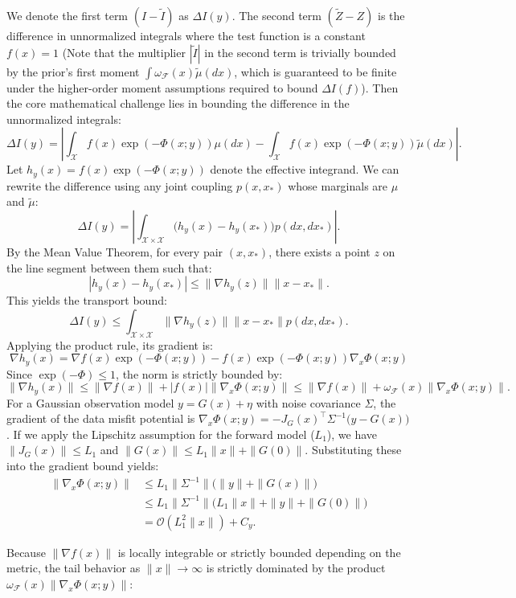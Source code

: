 \documentclass[twoside,11pt]{article}
\begin{document}
We denote the first term $(I - \tilde{I})$ as $\Delta I(y)$. The second term $(\tilde{Z} - Z)$ is the difference in unnormalized integrals where the test function is a constant $f(x) = 1$ (Note that the multiplier $|\tilde{I}|$ in the second term is trivially bounded by the prior's first moment $\int \omega_{\mathcal{F}}(x) \tilde{\mu}(dx)$, which is guaranteed to be finite under the higher-order moment assumptions required to bound $\Delta I(f)$). Then the core mathematical challenge lies in bounding the difference in the unnormalized integrals:$$\Delta I(y) = \left| \int_{\mathcal{X}} f(x) \exp(-\Phi(x;y)) \mu(dx) - \int_{\mathcal{X}} f(x) \exp(-\Phi(x;y)) \tilde{\mu}(dx) \right|.$$Let $h_y(x) = f(x) \exp(-\Phi(x;y))$ denote the effective integrand. We can rewrite the difference using any joint coupling $p(x, x_*)$ whose marginals are $\mu$ and $\tilde{\mu}$:
$$\Delta I(y) = \left| \int_{\mathcal{X} \times \mathcal{X}} \big( h_y(x) - h_y(x_*) \big) p(dx, dx_*) \right|.$$
By the Mean Value Theorem, for every pair $(x, x_*)$, there exists a point $z$ on the line segment between them such that:$$|h_y(x) - h_y(x_*)| \le \|\nabla h_y(z)\| \|x - x_*\|.$$
This yields the transport bound:$$\Delta I(y) \le \int_{\mathcal{X} \times \mathcal{X}} \|\nabla h_y(z)\| \|x - x_*\| p(dx, dx_*).$$
Applying the product rule, its gradient is:
$$\nabla h_y(x) = \nabla f(x) \exp(-\Phi(x;y)) - f(x) \exp(-\Phi(x;y)) \nabla_x \Phi(x;y)$$
Since $\exp(-\Phi) \le 1$, the norm is strictly bounded by:
$$\|\nabla h_y(x)\| \le \|\nabla f(x)\| + |f(x)| \|\nabla_x \Phi(x;y)\| \le \|\nabla f(x)\| + \omega_{\mathcal{F}}(x) \|\nabla_x \Phi(x;y)\|.$$
For a Gaussian observation model $y = G(x) + \eta$ with noise covariance $\Sigma$, the gradient of the data misfit potential is $\nabla_x \Phi(x;y) = -J_G(x)^\top \Sigma^{-1} \big(y - G(x)\big)$. If we apply the Lipschitz assumption for the forward model ($L_1$), we have $\|J_G(x)\| \le L_1$ and $\|G(x)\| \le L_1\|x\| + \|G(0)\|$. Substituting these into the gradient bound yields:
$$
\begin{aligned}
    \|\nabla_x \Phi(x;y)\| &\le L_1 \|\Sigma^{-1}\| \big( \|y\| + \|G(x)\| \big) \\
    &\le L_1 \|\Sigma^{-1}\| \big( L_1\|x\| + \|y\| + \|G(0)\| \big) \\
    &= \mathcal{O}(L_1^2 \|x\|) + C_y.
\end{aligned}
$$

Because $\|\nabla f(x)\|$ is locally integrable or strictly bounded depending on the metric, the tail behavior as $\|x\| \to \infty$ is strictly dominated by the product $\omega_{\mathcal{F}}(x) \|\nabla_x \Phi(x;y)\|$:
\end{document}
